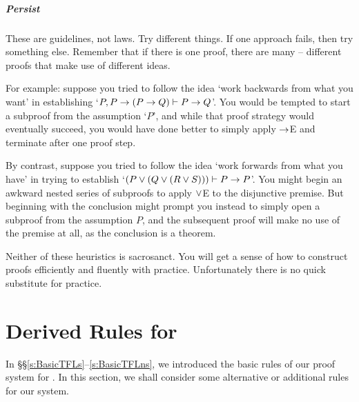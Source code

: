 \paragraph{Persist}
These are guidelines, not laws. Try different things. If one approach fails, then try something else. Remember that if there is one proof, there are many – different proofs that make use of different ideas.

For example: suppose you tried to follow the idea `work backwards from what you want' in establishing `$P, P \rightarrow (P \rightarrow Q) \vdash P \rightarrow Q$'. You would be tempted to start a subproof from the assumption `$P$', and while that proof strategy would eventually succeed, you would have done better to simply apply $\rightarrow$E and terminate after one proof step.

By contrast, suppose you tried to follow the idea `work forwards from what you have' in trying to establish `$(P \vee (Q \vee (R \vee S))) \vdash P \rightarrow P$'. You might begin an awkward nested series of subproofs to apply $\vee$E to the disjunctive premise. But beginning with the conclusion might prompt you instead to simply open a subproof from the assumption $P$, and the subsequent proof will make no use of the premise at all, as the conclusion is a theorem.

Neither of these heuristics is sacrosanct. You will get a sense of how to construct proofs efficiently and fluently with practice. Unfortunately there is no quick substitute for practice.








\chapter{Derived Rules for \textnormal{\TFL}}\label{s:Derived}
In §§\ref{s:BasicTFLs}–\ref{s:BasicTFLns}, we introduced the basic rules of our proof system for \TFL. In this section, we shall consider some alternative or additional rules for our system.

